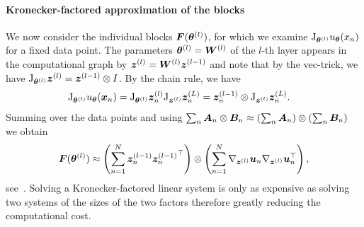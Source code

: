 \paragraph{Kronecker-factored approximation of the blocks}
We now consider the individual blocks ${\bm{F}}({\bm{\theta}}^{(l)})$, for which we examine $\mathrm{J}_{{\bm{\theta}}^{(l)}} u_{{\bm{\theta}}}(x_n)$ for a fixed data point. 
The parameters ${\bm{\theta}}^{(l)} = {\bm{W}}^{(l)}$ of the $l$-th layer appears in the computational graph by ${\bm{z}}^{(l)} = {\bm{W}}^{(l)}{\bm{z}}^{(l-1)}$ and note that by the vec-trick, we have $\mathrm{J}_{{\bm{\theta}}^{(l)}} {\bm{z}}^{(l)} = {\bm{z}}^{(l-1)} \otimes I$. 
By the chain rule, we have
\begin{align}
    \jac_{\vtheta^{(l)}} u_{\vtheta}(\vx_n) & = \jac_{\vtheta^{(l)}} \vz_n^{(l)} \jac_{\vz^{(l)}}  \vz^{(L)}_n = %
    \vz^{(l-1)}_n\otimes  \jac_{\vz^{(l)}}  \vz^{(L)}_n. 
\end{align}
Summing over the data points and using  $\sum_n {\bm{A}}_n \otimes {\bm{B}}_n \approx (\sum_n {\bm{A}}_n) \otimes (\sum_n {\bm{B}}_n)$ we obtain 
\begin{equation}
    \mF(\vtheta^{(l)}) %
    \approx \left(\sum_{n=1}^N \vz^{(l-1)}_n {\vz^{(l-1)}_n}^\top \right)\otimes \left(\sum_{n=1}^N\nabla_{\vz^{(l)}}  \vu_n\nabla_{\vz^{(l)}}  \vu_n^\top\right),
\end{equation}
see~\citep{eschenhagen2023kroneckerfactored}. 
Solving a Kronecker-factored linear system is only as expensive as solving two systems of the sizes of the two factors therefore greatly reducing the computational cost.  

